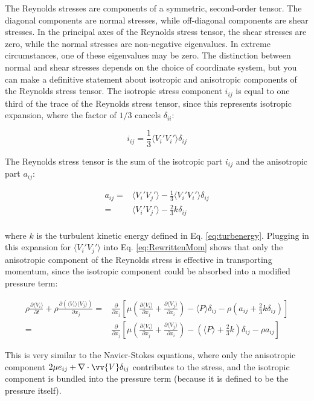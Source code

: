 \documentclass[10pt]{article}
\newcommand{\beq}{\begin{equation}}
\newcommand{\eeq}{\end{equation}}
\newcommand{\beqa}{\begin{equation}\begin{aligned}}
\newcommand{\eeqa}{\end{aligned}\end{equation}}
\newcommand{\la}{\langle}
\newcommand{\ra}{\rangle}
\begin{document}
\begin{flushleft}
The Reynolds stresses are components of a symmetric, second-order tensor. The diagonal components are normal stresses, while off-diagonal components are shear stresses. In the principal axes of the Reynolds stress tensor, the shear stresses are zero, while the normal stresses are non-negative eigenvalues. In extreme circumstances, one of these eigenvalues may be zero. The distinction between normal and shear stresses depends on the choice of coordinate system, but you can make a definitive statement about isotropic and anisotropic components of the Reynolds stress tensor. The isotropic stress component \(i_{ij}\) is equal to one third of the trace of the Reynolds stress tensor, since this represents isotropic expansion, where the factor of \(1/3\) cancels \(\delta_{ii}\): 

\beq
i_{ij} = \frac{1}{3}\la V_i'V_i'\ra\delta_{ij}
\eeq

The Reynolds stress tensor is the sum of the isotropic part \(i_{ij}\) and the anisotropic part \(a_{ij}\):

\beqa
a_{ij}=&\la V_i'V_j'\ra-\frac{1}{3}\la V_i'V_i'\ra\delta_{ij}\\
=& \la V_i'V_j'\ra-\frac{2}{3}k\delta_{ij}\\
\eeqa

where \(k\) is the turbulent kinetic energy defined in Eq. \eqref{eq:turbenergy}. Plugging in this expansion for \(\la V_i'V_j'\ra\) into Eq. \eqref{eq:RewrittenMom} shows that only the anisotropic component of the Reynolds stress is effective in transporting momentum, since the isotropic component could be absorbed into a modified pressure term:

\beqa
\rho\frac{\partial \la V_i\ra}{\partial t}+\rho\frac{\partial(\la V_i\ra\la V_j\ra)}{\partial x_j}=&\frac{\partial}{\partial x_j}\left\lbrack\mu\left(\frac{\partial\la V_i\ra}{\partial x_j}+\frac{\partial\la V_j\ra}{\partial x_i}\right)-\la P\ra\delta_{ij}-\rho \left(a_{ij}+\frac{2}{3}k\delta_{ij}\right)\right\rbrack\\
=&\frac{\partial}{\partial x_j}\left\lbrack\mu\left(\frac{\partial\la V_i\ra}{\partial x_j}+\frac{\partial\la V_j\ra}{\partial x_i}\right)-\left(\la P\ra+\frac{2}{3}k\right)\delta_{ij}-\rho a_{ij}\right\rbrack
\eeqa

This is very similar to the Navier-Stokes equations, where only the anisotropic component \(2\mu e_{ij}+\nabla\cdot\vv{V}\delta_{ij}\) contributes to the stress, and the isotropic component is bundled into the pressure term (because it is defined to be the pressure itself). 





\end{flushleft}
\end{document}
